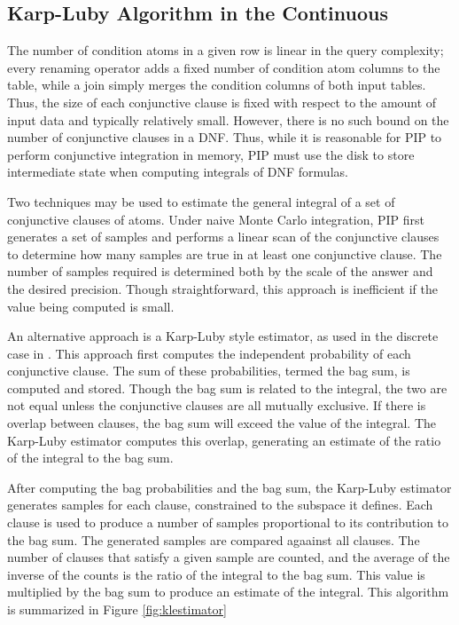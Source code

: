 \subsection{Karp-Luby Algorithm in the Continuous}


The number  of condition atoms in a  given row  is linear in  the query
complexity;  every renaming operator  adds a  fixed number  of condition
atom  columns to the  table, while  a join  simply merges  the condition
columns  of both  input tables.   Thus, the  size of  each conjunctive
clause is fixed with respect to the amount of input data and typically
relatively small.   However, there is no  such bound on  the number of
conjunctive  clauses  in a DNF.   Thus,  while  it  is
reasonable for  PIP to perform conjunctive integration  in memory, PIP
must use the disk to store intermediate state when computing integrals
of DNF formulas.

Two techniques may  be used to estimate the general  integral of a set
of conjunctive clauses of atoms.  Under naive Monte Carlo integration,
PIP first generates a set of samples and performs a linear scan of the
conjunctive clauses to determine how many samples are true in at least
one conjunctive clause.  The  number of samples required is determined
both by  the scale  of the answer  and the desired  precision.  Though
straightforward,  this  approach is  inefficient  if  the value  being
computed is small.

An  alternative approach  is a  Karp-Luby style  estimator, as
used  in the discrete case in \cite{RDS07, KO2008}.   This  approach first  computes  the
independent probability of each  conjunctive clause.  The sum of these
probabilities, termed the bag sum, is computed and stored.  Though the
bag sum is  related to the integral, the two are  not equal unless the
conjunctive clauses  are all mutually exclusive.  If  there is overlap
between clauses,  the bag sum will  exceed the value  of the integral.
The Karp-Luby estimator computes  this overlap, generating an estimate
of the ratio of the integral to the bag sum.

After computing the  bag probabilities and the bag  sum, the Karp-Luby
estimator  generates  samples  for  each clause,  constrained  to  the
subspace  it defines.   Each clause  is used  to produce  a  number of
samples  proportional  to  its  contribution  to  the  bag  sum.   The
generated samples  are compared agaainst  all clauses.  The  number of
clauses that  satisfy a given sample  are counted, and  the average of
the inverse of the counts is the ratio of the integral to the bag sum.
This value is multiplied by the  bag sum to produce an estimate of the
integral.  This algorithm is summarized in Figure
\ref{fig:klestimator}


